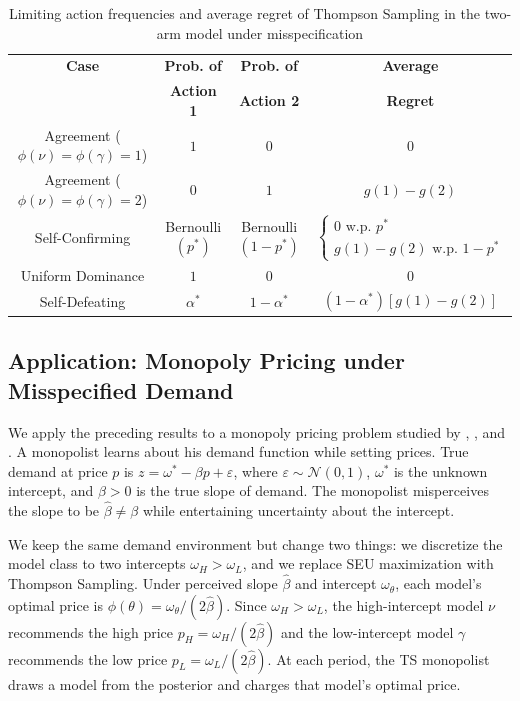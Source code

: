 \documentclass[12pt]{article}
\begin{document}
\begin{table}[H]
\centering
\begin{tabular}{|c|c|c|c|}
\hline
\textbf{Case} & \textbf{Prob. of} & \textbf{Prob. of} & \textbf{Average} \\
& \textbf{Action 1} & \textbf{Action 2} & \textbf{Regret} \\
\hline
Agreement ($\phi(\nu)=\phi(\gamma)=1$) & $1$ & $0$ & $0$ \\
\hline
Agreement ($\phi(\nu)=\phi(\gamma)=2$) & $0$ & $1$ & $g(1) - g(2)$ \\
\hline
Self-Confirming & Bernoulli$(p^*)$ & Bernoulli$(1-p^*)$ & $\begin{cases} 0 \text{ w.p. } p^* \\ g(1)-g(2) \text{ w.p. } 1-p^* \end{cases}$ \\
\hline
Uniform Dominance & $1$ & $0$ & $0$ \\
\hline
Self-Defeating & $\alpha^*$ & $1-\alpha^*$ & $(1-\alpha^*)[g(1) - g(2)]$ \\
\hline
\end{tabular}
\caption{Limiting action frequencies and average regret of Thompson Sampling in the two-arm model under misspecification}
\label{tab:regret_analysis_two_arm}
\end{table}


\subsection{Application: Monopoly Pricing under Misspecified Demand}
\label{sec:pricing_application}

We apply the preceding results to a monopoly pricing problem studied by \citet{espondaBerkNashEquilibrium2016}, \citet{heidhuesConvergenceMisspecifiedLearning2021}, and \citet{frickBeliefConvergenceMisspecified2023}. A monopolist learns about his demand function while setting prices. True demand at price $p$ is $z = \omega^* - \beta p + \varepsilon$, where $\varepsilon \sim \mathcal{N}(0,1)$, $\omega^*$ is the unknown intercept, and $\beta > 0$ is the true slope of demand. The monopolist misperceives the slope to be $\hat{\beta} \neq \beta$ while entertaining uncertainty about the intercept.

We keep the same demand environment but change two things: we discretize the model class to two intercepts $\omega_H > \omega_L$, and we replace SEU maximization with Thompson Sampling. Under perceived slope $\hat{\beta}$ and intercept $\omega_\theta$, each model's optimal price is $\phi(\theta) = \omega_\theta/(2\hat{\beta})$. Since $\omega_H > \omega_L$, the high-intercept model $\nu$ recommends the high price $p_H = \omega_H/(2\hat{\beta})$ and the low-intercept model $\gamma$ recommends the low price $p_L = \omega_L/(2\hat{\beta})$. At each period, the TS monopolist draws a model from the posterior and charges that model's optimal price.
\end{document}
